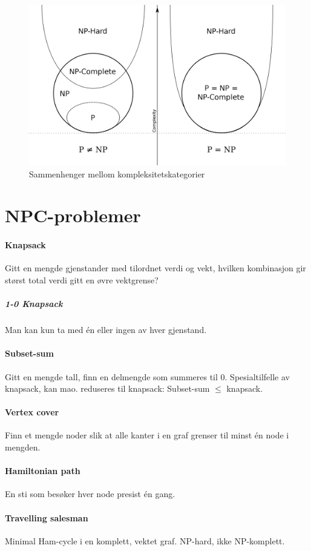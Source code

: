 \documentclass[a4paper]{article}
\begin{document}
\begin{figure}[H]
  \centering
  \includegraphics[width=0.8\linewidth]{complexity_venn}
  \caption{Sammenhenger mellom kompleksitetskategorier}
\end{figure}



\section{NPC-problemer}
\paragraph{Knapsack} Gitt en mengde gjenstander med tilordnet verdi og vekt, hvilken kombinasjon gir størst total verdi gitt en øvre vektgrense?
\subparagraph{1-0 Knapsack} Man kan kun ta med én eller ingen av hver gjenstand.
\paragraph{Subset-sum} Gitt en mengde tall, finn en delmengde som summeres til $0$. Spesialtilfelle av knapsack, kan mao. reduseres til knapsack: Subset-sum $\leqslant$ \mbox{knapsack}.
\paragraph{Vertex cover} Finn et mengde noder slik at alle kanter i en graf grenser til minst én node i mengden.
\paragraph{Hamiltonian path} En sti som besøker hver node presist én gang.
\paragraph{Travelling salesman} Minimal Ham-cycle i en komplett, vektet graf. NP-hard, ikke NP-komplett.
\end{document}
